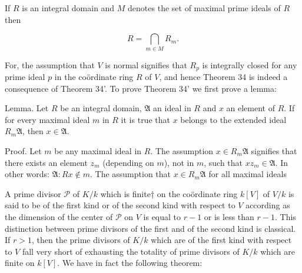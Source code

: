 If $R$ is an integral domain and $M$ denotes the set of maximal prime ideals of $R$ then

$$R = \bigcap_{m \in M} R_m.$$

For, the assumption that $V$ is normal signifies that $R_p$ is integrally closed for any prime ideal $p$ in the coördinate ring $R$ of $V$, and hence Theorem 34 is indeed a consequence of Theorem 34'. To prove Theorem 34' we first prove a lemma:

Lemma. Let $R$ be an integral domain, $\mathfrak{A}$ an ideal in $R$ and $x$ an element of $R$. If for every maximal ideal $m$ in $R$ it is true that $x$ belongs to the extended ideal $R_m\mathfrak{A}$, then $x \in \mathfrak{A}$.

Proof. Let $m$ be any maximal ideal in $R$. The assumption $x \in R_m\mathfrak{A}$ signifies that there exists an element $z_m$ (depending on $m$), not in $m$, such that $xz_m \in \mathfrak{A}$. In other words: $\mathfrak{A}: Rx \notin m$. The assumption that $x \in R_m\mathfrak{A}$ for all maximal ideals

A prime divisor $\mathcal{P}$ of $K/k$ which is finite† on the coördinate ring $k[V]$ of $V/k$ is said to be of the first kind or of the second kind with respect to $V$ according as the dimension of the center of $\mathcal{P}$ on $V$ is equal to $r-1$ or is less than $r-1$. This distinction between prime divisors of the first and of the second kind is classical. If $r>1$, then the prime divisors of $K/k$ which are of the first kind with respect to $V$ fall very short of exhausting the totality of prime divisors of $K/k$ which are finite on $k[V]$. We have in fact the following theorem: